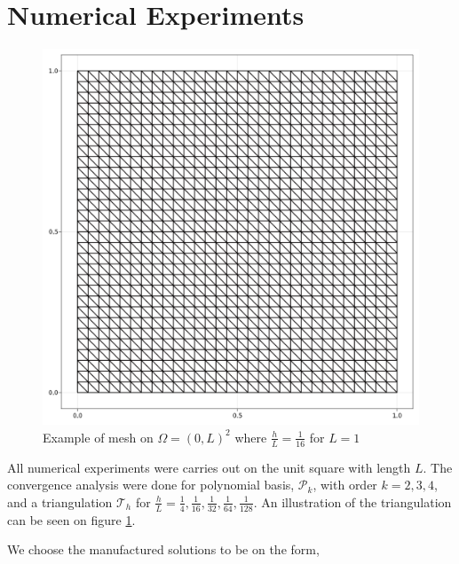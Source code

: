 


\newpage
\section{Numerical Experiments}%
\label{sub:manufactured_solution}

\begin{figure}[h!]
    \centering
    \includegraphics[width=0.4 \textwidth]{figures/model/l_1.0_m_1_r_1n_30_grid.png}
    \caption{Example of mesh on $ \Omega =  \left( 0,L  \right)^{2}$ where $\frac{h}{L}=\frac{1}{16}$ for $L=1$   }
    \label{fig:sol_l1_m1_r1}
\end{figure}

All numerical experiments were carries out on the unit square with length $L$. The convergence analysis were done for polynomial basis, $\mathcal{P}_{k} $, with order $k=2,3,4$, and a triangulation $\mathcal{T} _{h}$ for $\frac{h}{L} = \frac{1}{4},
\frac{1}{16}, \frac{1}{32},\frac{1}{64}, \frac{1}{128} $.
An illustration of the triangulation can be seen on figure \ref{fig:sol_l1_m1_r1}.

We choose the manufactured solutions to be on the form,

